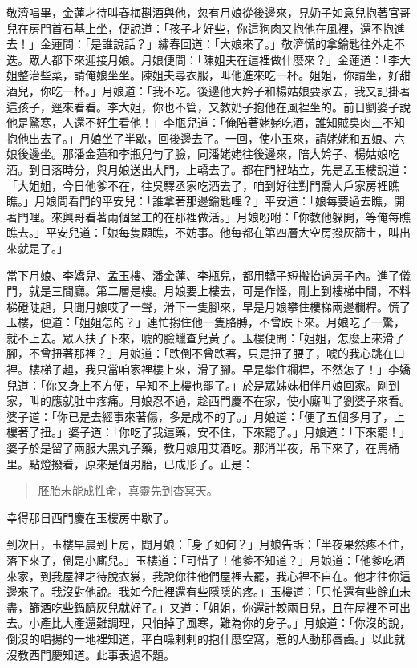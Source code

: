 敬濟唱畢，金蓮才待叫春梅斟酒與他，忽有月娘從後邊來，見奶子如意兒抱著官哥兒在房門首石基上坐，便說道：「孩子才好些，你這狗肉又抱他在風裡，還不抱進去！」金蓮問：「是誰說話？」繡春回道：「大娘來了。」敬濟慌的拿鑰匙往外走不迭。眾人都下來迎接月娘。月娘便問：「陳姐夫在這裡做什麼來？」金蓮道：「李大姐整治些菜，請俺娘坐坐。陳姐夫尋衣服，叫他進來吃一杯。姐姐，你請坐，好甜酒兒，你吃一杯。」月娘道：「我不吃。後邊他大妗子和楊姑娘要家去，我又記掛著這孩子，逕來看看。李大姐，你也不管，又教奶子抱他在風裡坐的。前日劉婆子說他是驚寒，人還不好生看他！」李瓶兒道：「俺陪著姥姥吃酒，誰知賊臭肉三不知抱他出去了。」月娘坐了半歇，回後邊去了。一回，使小玉來，請姥姥和五娘、六娘後邊坐。那潘金蓮和李瓶兒勻了臉，同潘姥姥往後邊來，陪大妗子、楊姑娘吃酒。到日落時分，與月娘送出大門，上轎去了。都在門裡站立，先是孟玉樓說道：「大姐姐，今日他爹不在，往吳驛丞家吃酒去了，咱到好往對門喬大戶家房裡瞧瞧。」月娘問看門的平安兒：「誰拿著那邊鑰匙哩？」平安道：「娘每要過去瞧，開著門哩。來興哥看著兩個坌工的在那裡做活。」月娘吩咐：「你教他躲開，等俺每瞧瞧去。」平安兒道：「娘每隻顧瞧，不妨事。他每都在第四層大空房撥灰篩土，叫出來就是了。」

當下月娘、李嬌兒、孟玉樓、潘金蓮、李瓶兒，都用轎子短搬抬過房子內。進了儀門，就是三間廳。第二層是樓。月娘要上樓去，可是作怪，剛上到樓梯中間，不料梯磴陡趄，只聞月娘哎了一聲，滑下一隻腳來，早是月娘攀住樓梯兩邊欄桿。慌了玉樓，便道：「姐姐怎的？」連忙搊住他一隻胳膊，不曾跌下來。月娘吃了一驚，就不上去。眾人扶了下來，唬的臉蠟查兒黃了。玉樓便問：「姐姐，怎麼上來滑了腳，不曾扭著那裡？」月娘道：「跌倒不曾跌著，只是扭了腰子，唬的我心跳在口裡。樓梯子趄，我只當咱家裡樓上來，滑了腳。早是攀住欄桿，不然怎了！」李嬌兒道：「你又身上不方便，早知不上樓也罷了。」於是眾姊妹相伴月娘回家。剛到家，叫的應就肚中疼痛。月娘忍不過，趁西門慶不在家，使小廝叫了劉婆子來看。婆子道：「你已是去經事來著傷，多是成不的了。」月娘道：「便了五個多月了，上樓著了扭。」婆子道：「你吃了我這藥，安不住，下來罷了。」月娘道：「下來罷！」婆子於是留了兩服大黑丸子藥，教月娘用艾酒吃。那消半夜，吊下來了，在馬桶里。點燈撥看，原來是個男胎，已成形了。正是：
\begin{quote}
胚胎未能成性命，真靈先到杳冥天。
\end{quote}

幸得那日西門慶在玉樓房中歇了。

到次日，玉樓早晨到上房，問月娘：「身子如何？」月娘告訴：「半夜果然疼不住，落下來了，倒是小廝兒。」玉樓道：「可惜了！他爹不知道？」月娘道：「他爹吃酒來家，到我屋裡才待脫衣裳，我說你往他們屋裡去罷，我心裡不自在。他才往你這邊來了。我沒對他說。我如今肚裡還有些隱隱的疼。」玉樓道：「只怕還有些餘血未盡，篩酒吃些鍋臍灰兒就好了。」又道：「姐姐，你還計較兩日兒，且在屋裡不可出去。小產比大產還難調理，只怕掉了風寒，難為你的身子。」月娘道：「你沒的說，倒沒的唱揚的一地裡知道，平白噪剌剌的抱什麼空窩，惹的人動那唇齒。」以此就沒教西門慶知道。此事表過不題。

